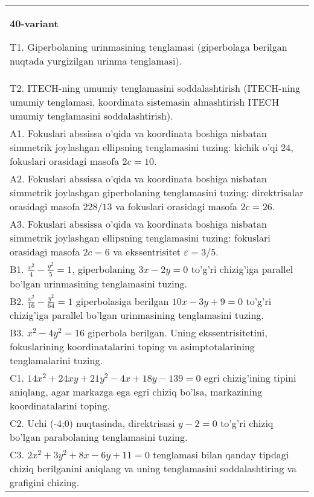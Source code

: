 \documentclass{article}
\begin{document}
\begin{tabular}{m{17cm}}
\textbf{40-variant}
\newline

T1. Giperbolaning urinmasining tenglamasi (giperbolaga berilgan nuqtada yurgizilgan urinma tenglamasi).\\

T2. ITECH-ning umumiy tenglamasini soddalashtirish (ITECH-ning umumiy tenglamasi, koordinata sistemasin almashtirish ITECH umumiy tenglamasini soddalashtirish).\\

A1. Fokuslari abssissa o'qida va koordinata boshiga nisbatan simmetrik joylashgan ellipsning tenglamasini tuzing: kichik o'qi $24$, fokuslari orasidagi masofa $2c=10$.\\

A2. Fokuslari abssissa o'qida va koordinata boshiga nisbatan simmetrik joylashgan giperbolaning tenglamasini tuzing: direktrisalar orasidagi masofa $228/13$ va fokuslari orasidagi masofa $2c=26$.\\

A3. Fokuslari abssissa o'qida va koordinata boshiga nisbatan simmetrik joylashgan ellipsning tenglamasini tuzing: fokuslari orasidagi masofa $2c=6$ va ekssentrisitet $\varepsilon=3/5$.\\

B1. $\frac{x^{2}}{4} - \frac{y^{2}}{5} = 1$, giperbolaning $3x - 2y = 0$ to'g'ri chizig'iga parallel bo'lgan urinmasining tenglamasini tuzing.  \\

B2. $\frac{x^{2}}{16} - \frac{y^{2}}{64} = 1$ giperbolasiga berilgan $10x - 3y + 9 = 0$ to'g'ri chizig'iga parallel bo'lgan urinmasining tenglamasini tuzing.  \\

B3. $x^{2} - 4y^{2} = 16$ giperbola berilgan. Uning ekssentrisitetini, fokuslarining koordinatalarini toping va asimptotalarining tenglamalarini tuzing.\\

C1. $14x^{2} + 24xy + 21y^{2} - 4x + 18y - 139 = 0$ egri chizig'ining tipini aniqlang, agar markazga ega egri chiziq bo'lsa, markazining koordinatalarini toping.  \\

C2. Uchi (-4;0) nuqtasinda, direktrisasi $y - 2 = 0$ to'g'ri chiziq bo'lgan parabolaning tenglamasini tuzing.\\

C3. $2x^{2} + 3y^{2} + 8x - 6y + 11 = 0$ tenglamasi bilan qanday tipdagi chiziq berilganini aniqlang va uning tenglamasini soddalashtiring va grafigini chizing.  \\

\end{tabular}
\vspace{1cm}
\end{document}
